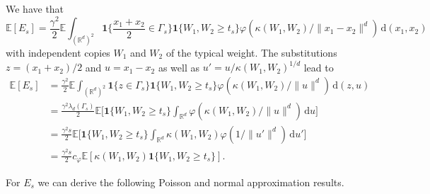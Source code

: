 \documentclass{article}
\theoremstyle{definition}
\numberwithin{equation}{section}
\theoremstyle{remark}
\begin{document}
We have that
$$
\mathbb{E}[E_s] = \frac{\gamma^2}{2} \mathbb{E} \int_{(\mathbb{R}^d)^2} \mathbf{1}\bigg\{ \frac{x_1+x_2}{2}\in \Gamma_s \bigg\} \mathbf{1}\{W_1,W_2\geq t_s\}  \varphi(\kappa(W_1,W_2)/\|x_1-x_2\|^d) \, \mathrm{d}(x_1,x_2)
$$
with independent copies $W_1$ and $W_2$ of the typical weight. The substitutions $z=(x_1+x_2)/2$ and $u=x_1-x_2$ as well as $u'=u/\kappa(W_1,W_2)^{1/d}$ lead to
\begin{align*}
\mathbb{E}[E_s] & = \frac{\gamma^2}{2} \mathbb{E} \int_{(\mathbb{R}^d)^2} \mathbf{1}\{z\in \Gamma_s\} \mathbf{1}\{W_1,W_2\geq t_s\}  \varphi(\kappa(W_1,W_2)/\|u\|^d) \, \mathrm{d}(z,u) \\
& =  \frac{\gamma^2 \lambda_d(\Gamma_s)}{2} \mathbb{E}\bigg[ \mathbf{1}\{W_1,W_2\geq t_s\}  \int_{\mathbb{R}^d}  \varphi(\kappa(W_1,W_2)/\|u\|^d) \, \mathrm{d}u \bigg] \\
& =  \frac{\gamma^2 s}{2} \mathbb{E}\bigg[ \mathbf{1}\{W_1,W_2\geq t_s\}  \int_{\mathbb{R}^d} \kappa(W_1,W_2) \varphi(1/\|u'\|^d) \, \mathrm{d}u' \bigg] \\
& = \frac{\gamma^2 s}{2} c_\varphi \mathbb{E}[\kappa(W_1,W_2) \mathbf{1}\{W_1,W_2\geq t_s\}].
\end{align*}

For $E_s$ we can derive the following Poisson and normal approximation results.
\end{document}
